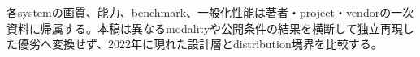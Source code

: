 \begin{claimboundary}
各systemの画質、能力、benchmark、一般化性能は著者・project・vendorの一次資料に帰属する。本稿は異なるmodalityや公開条件の結果を横断して独立再現した優劣へ変換せず、2022年に現れた設計層とdistribution境界を比較する。\autocite{src-16a1a1dc486e,src-26aadbc0393f,src-27297a80fac0,src-2832ee43ab8f,src-2c38d2f354fa,src-86ce6205a4ed,src-929080260e16}
\end{claimboundary}
